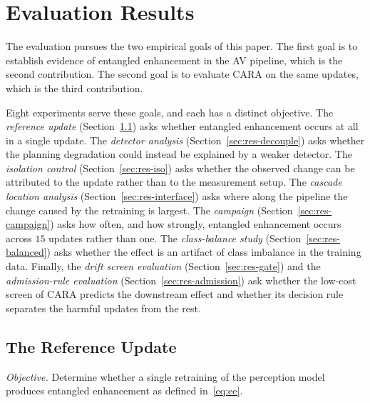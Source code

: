 \documentclass[conference]{IEEEtran}
\begin{document}
\section{Evaluation Results}
\label{sec:results}
The evaluation pursues the two empirical goals of this paper. The first goal is to
establish evidence of entangled enhancement in the AV pipeline, which is the
second contribution. The second goal is to evaluate CARA on the same updates,
which is the third contribution.

Eight experiments serve these goals, and each has a distinct objective. The
\emph{reference update} (Section~\ref{sec:res-ref}) asks whether entangled
enhancement occurs at all in a single update. The \emph{detector
analysis} (Section~\ref{sec:res-decouple}) asks whether the planning degradation
could instead be explained by a weaker detector. The \emph{isolation control}
(Section~\ref{sec:res-iso}) asks whether the observed change can be attributed to
the update rather than to the measurement setup. The \emph{cascade location
analysis} (Section~\ref{sec:res-interface}) asks where along the pipeline the
change caused by the retraining is largest. The \emph{campaign}
(Section~\ref{sec:res-campaign}) asks how often, and how strongly, entangled
enhancement occurs across $15$ updates rather than one. The \emph{class-balance
study} (Section~\ref{sec:res-balanced}) asks whether the effect is an artifact of
class imbalance in the training data. Finally, the \emph{drift screen evaluation}
(Section~\ref{sec:res-gate}) and the \emph{admission-rule evaluation}
(Section~\ref{sec:res-admission}) ask whether the low-cost screen of CARA predicts
the downstream effect and whether its decision rule separates the harmful updates
from the rest.

\subsection{The Reference Update}
\label{sec:res-ref}
\emph{Objective.} Determine whether a single retraining of the perception model
produces entangled enhancement as defined in~\eqref{eq:ee}.
\end{document}
